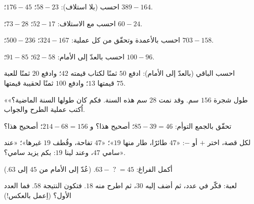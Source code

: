 \begin{exercise}[$\star$]\label{exo:g2:subtraction:1}
احسب (بلا استلاف): $58 - 23$؛ \quad $176 - 45$؛ \quad
$389 - 164$.
\end{exercise}

\begin{exercise}[$\star$]\label{exo:g2:subtraction:2}
احسب مع الاستلاف: $52 - 17$؛ \quad $73 - 28$؛ \quad
$60 - 24$.
\end{exercise}

\begin{exercise}[$\star$]\label{exo:g2:subtraction:3}
احسب بالأعمدة وتحقّق من كل عملية: $324 - 167$؛ \quad
$500 - 236$؛ \quad $703 - 158$.
\end{exercise}

\begin{exercise}[$\star$]\label{exo:g2:subtraction:4}
احسب بالعدّ إلى الأمام: $62 - 58$؛ \quad $91 - 85$؛ \quad
$100 - 96$.
\end{exercise}

\begin{exercise}[$\star$]\label{exo:g2:subtraction:5}
احسب الباقي (بالعدّ إلى الأمام): ادفع $50$ ثمنًا لكتاب قيمته $42$؛
وادفع $20$ ثمنًا للعبة قيمتها $13$؛ وادفع $100$ ثمنًا لحقيبة قيمتها $75$.
\end{exercise}

\begin{exercise}[$\star$]\label{exo:g2:subtraction:6}
«طول شجرة $156$ سم. وقد نمت $28$ سم هذه السنة. فكم كان طولها
السنة الماضية؟» اُكتب عملية الطرح والجواب.
\end{exercise}

\begin{exercise}[$\star$]\label{exo:g2:subtraction:7}
تحقّق بالجمع التوأم: $85 - 39 = 46$؛ أصحيح هذا؟
و $214 - 68 = 156$؛ أصحيح هذا؟
\end{exercise}

\begin{exercise}[$\star$]\label{exo:g2:subtraction:8}
لكل قصة، اختر $+$ أو $-$: «$47$ طائرًا، طار منها $19$»؛
«$47$ تفاحة، وقُطف $19$ غيرها»؛ «عند سامي $47$، وعند لينا $19$:
بكم يزيد سامي؟».
\end{exercise}

\begin{exercise}[$\star$]\label{exo:g2:subtraction:9}
أكمل الفراغ: $63 - \;?\; = 45$. (عُدّ إلى الأمام من $45$ إلى $63$.)
\end{exercise}

\begin{exercise}[$\star\star$]\label{exo:g2:subtraction:10}
لعبة: فكّر في عدد، ثم أضف إليه $30$، ثم اطرح منه $18$.
فتكون النتيجة $58$. فما العدد الأول؟ (اِعمل بالعكس!)
\end{exercise}
